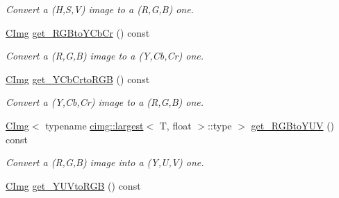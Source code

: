 \begin{DoxyCompactItemize}
\begin{DoxyCompactList}\small\item\em Convert a (H,S,V) image to a (R,G,B) one. \item\end{DoxyCompactList}\item 
\hypertarget{structcimg__library_1_1_c_img_a0e8c064bbeadbd25d9924a8e594b890f}{
\hyperlink{structcimg__library_1_1_c_img}{CImg} \hyperlink{structcimg__library_1_1_c_img_a0e8c064bbeadbd25d9924a8e594b890f}{get\_\-RGBtoYCbCr} () const }
\label{structcimg__library_1_1_c_img_a0e8c064bbeadbd25d9924a8e594b890f}

\begin{DoxyCompactList}\small\item\em Convert a (R,G,B) image to a (Y,Cb,Cr) one. \item\end{DoxyCompactList}\item 
\hypertarget{structcimg__library_1_1_c_img_a22f571efbd6926153c907f46e156a87e}{
\hyperlink{structcimg__library_1_1_c_img}{CImg} \hyperlink{structcimg__library_1_1_c_img_a22f571efbd6926153c907f46e156a87e}{get\_\-YCbCrtoRGB} () const }
\label{structcimg__library_1_1_c_img_a22f571efbd6926153c907f46e156a87e}

\begin{DoxyCompactList}\small\item\em Convert a (Y,Cb,Cr) image to a (R,G,B) one. \item\end{DoxyCompactList}\item 
\hypertarget{structcimg__library_1_1_c_img_adda4f0765c0c24bb2fa086b2c5e09a8f}{
\hyperlink{structcimg__library_1_1_c_img}{CImg}$<$ typename \hyperlink{structcimg__library_1_1cimg_1_1largest}{cimg::largest}$<$ T, float $>$::type $>$ \hyperlink{structcimg__library_1_1_c_img_adda4f0765c0c24bb2fa086b2c5e09a8f}{get\_\-RGBtoYUV} () const }
\label{structcimg__library_1_1_c_img_adda4f0765c0c24bb2fa086b2c5e09a8f}

\begin{DoxyCompactList}\small\item\em Convert a (R,G,B) image into a (Y,U,V) one. \item\end{DoxyCompactList}\item 
\hypertarget{structcimg__library_1_1_c_img_a6d1ddd191b37dd3c3f08f39b28df98e9}{
\hyperlink{structcimg__library_1_1_c_img}{CImg} \hyperlink{structcimg__library_1_1_c_img_a6d1ddd191b37dd3c3f08f39b28df98e9}{get\_\-YUVtoRGB} () const }
\label{structcimg__library_1_1_c_img_a6d1ddd191b37dd3c3f08f39b28df98e9}


\end{DoxyCompactItemize}
